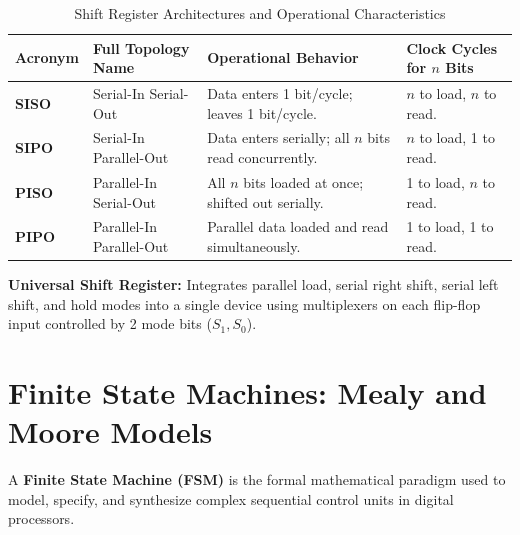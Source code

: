 \begin{table}[htbp]
\centering
\small
\caption{Shift Register Architectures and Operational Characteristics}
\label{tab:shift_registers}
\begin{tabularx}{\textwidth}{l l X l}
\toprule
\textbf{Acronym} & \textbf{Full Topology Name} & \textbf{Operational Behavior} & \textbf{Clock Cycles for $n$ Bits} \\
\midrule
\textbf{SISO} & Serial-In Serial-Out & Data enters 1 bit/cycle; leaves 1 bit/cycle. & $n$ to load, $n$ to read. \\
\textbf{SIPO} & Serial-In Parallel-Out & Data enters serially; all $n$ bits read concurrently. & $n$ to load, 1 to read. \\
\textbf{PISO} & Parallel-In Serial-Out & All $n$ bits loaded at once; shifted out serially. & 1 to load, $n$ to read. \\
\textbf{PIPO} & Parallel-In Parallel-Out & Parallel data loaded and read simultaneously. & 1 to load, 1 to read. \\
\bottomrule
\end{tabularx}
\end{table}

\textbf{Universal Shift Register:} Integrates parallel load, serial right shift, serial left shift, and hold modes into a single device using multiplexers on each flip-flop input controlled by 2 mode bits ($S_1, S_0$).


\section{Finite State Machines: Mealy and Moore Models}
\label{sec:fsm}

A \textbf{Finite State Machine (FSM)} is the formal mathematical paradigm used to model, specify, and synthesize complex sequential control units in digital processors.

